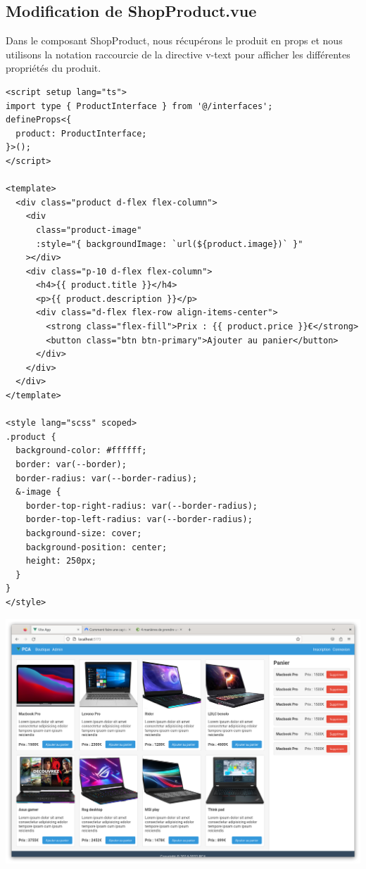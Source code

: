 \subsection{Modification de {\color{monOrange}ShopProduct.vue}}
Dans le composant {\color{monOrange}ShopProduct}, nous récupérons le produit en {\color{monOrange}props} et nous utilisons la notation raccourcie de la directive {\color{monOrange}v-text} pour afficher les différentes propriétés du produit.
\begin{verbatim}
<script setup lang="ts">
import type { ProductInterface } from '@/interfaces';
defineProps<{
  product: ProductInterface;
}>();
</script>

<template>
  <div class="product d-flex flex-column">
    <div
      class="product-image"
      :style="{ backgroundImage: `url(${product.image})` }"
    ></div>
    <div class="p-10 d-flex flex-column">
      <h4>{{ product.title }}</h4>
      <p>{{ product.description }}</p>
      <div class="d-flex flex-row align-items-center">
        <strong class="flex-fill">Prix : {{ product.price }}€</strong>
        <button class="btn btn-primary">Ajouter au panier</button>
      </div>
    </div>
  </div>
</template>

<style lang="scss" scoped>
.product {
  background-color: #ffffff;
  border: var(--border);
  border-radius: var(--border-radius);
  &-image {
    border-top-right-radius: var(--border-radius);
    border-top-left-radius: var(--border-radius);
    background-size: cover;
    background-position: center;
    height: 250px;
  }
}
</style>
\end{verbatim} 
\begin{center}
\includegraphics[width=15cm]{images/image20.png}
\end{center}

